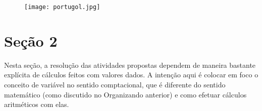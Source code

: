 \begin{figure}[H]
\centering
\texttt{[image: portugol.jpg]}
\end{figure}

\section{Seção 2}

\begin{texto}
{
Nesta seção, a resolução das atividades propostas dependem de maneira bastante explícita de cálculos feitos com valores dados. A intenção aqui é colocar em foco o conceito de variável no sentido comptacional, que é diferente do sentido matemático (como discutido no Organizando anterior) e como efetuar cálculos aritméticos com elas.
}
\end{texto}

